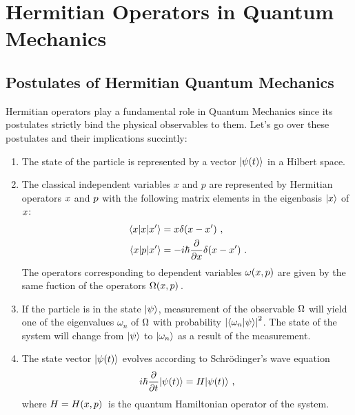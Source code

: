 \chapter{Hermitian Operators in Quantum Mechanics}\label{ch:hermiticity}
    \section{Postulates of Hermitian Quantum Mechanics}
        Hermitian operators play a fundamental role in Quantum Mechanics since its postulates strictly bind the physical observables to them. Let's go over these postulates \cite{Shankar2012-kg} and their implications \cite{Shankar2012-kg,Sakurai2020-pu} succintly:
        \begin{enumerate}[label=\Roman*.] 
            \item The state of the particle is represented by a vector $\ket{\psi\pqty{t}}$ in a Hilbert space.
            \item The classical independent variables $x$ and $p$ are represented by Hermitian operators ${x}$ and ${p}$ with the following matrix elements in the eigenbasis $\ket{x}$ of ${x}$:
            \begin{align*}
                \mel*{x}{\hx}{x'} &= x\delta\pqty*{x-x'} \mycomma \\
                \mel*{x}{\hp}{x'} &= -i\hbar\pdv{x}\delta\pqty*{x-x'} \myperiod
            \end{align*}
            The operators corresponding to dependent variables $\omega\pqty{x,p}$ are given by the same fuction of the operators $\togglehat{\Omega}\pqty*{\hx,\hp}$.
            \item If the particle is in the state $\ket{\psi}$, measurement of the observable ${\Omega}$ will yield one of the eigenvalues $\omega_n$ of ${\Omega}$ with probability $\abs{\braket{\omega_n}{\psi}}^2$. The state of the system will change from $\ket{\psi}$ to $\ket{\omega_n}$ as a result of the measurement.
            \item The state vector $\ket{\psi\pqty{t}}$ evolves according to Schr\"odinger's wave equation
            \begin{equation}
                i\hbar\pdv{t}\!\ket{\psi\pqty{t}} = \hH\!\ket{\psi\pqty{t}}
                \mycomma
                \label{eq:schrodinger}
            \end{equation}
            where $\hH = \hH\pqty*{\hx,\hp}$ is the quantum Hamiltonian operator of the system.
        \end{enumerate}


